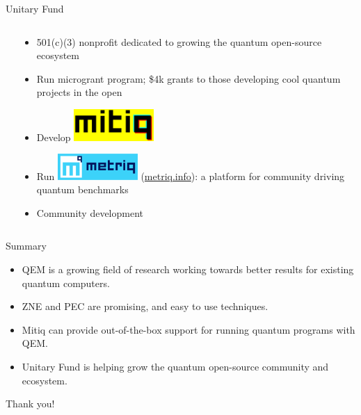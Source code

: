 \documentclass[11pt,aspectratio=1610,xcolor=dvipsnames]{beamer}
\begin{document}
\begin{frame}{Unitary Fund}
\begin{columns}
\begin{column}{0.5\textwidth}
		\end{column}
		\begin{column}{0.5\textwidth}
			\begin{itemize}[<+->]
				\item 501(c)(3) nonprofit dedicated to growing the quantum open-source ecosystem
				\item \alert<2>{Run microgrant program; \$4k grants to those developing cool quantum projects in the open}
				\item Develop \includegraphics[width=0.25\textwidth]{mitiq-logo.png}
				\item \alert<4>{Run \includegraphics[width=0.25\textwidth]{metriq-logo.png} (\url{metriq.info}): a platform for community driving quantum benchmarks}
				\item \alert<5>{Community development}
			\end{itemize}
		\end{column}
	\end{columns}
\end{frame}


\begin{frame}{Summary}
	\begin{itemize}
		\item QEM is a growing field of research working towards better results for existing quantum computers.
		\item ZNE and PEC are promising, and easy to use techniques.
		\item Mitiq can provide out-of-the-box support for running quantum programs with QEM.
		\item Unitary Fund is helping grow the quantum open-source community and ecosystem.
	\end{itemize}
\end{frame}


\begin{frame}[standout]
	Thank you!
\end{frame}
\end{document}
